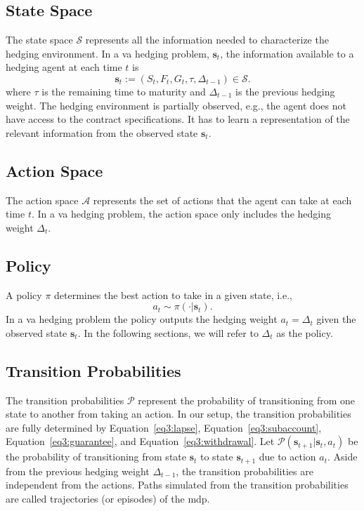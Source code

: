 \subsection{State Space}
The state space $\mathcal{S}$ represents all the information needed to characterize the hedging environment.
In a \gls{va} hedging problem, $\mathbf{s}_t$, the information available to a hedging agent at each time $t$ is 
$$\mathbf{s}_t := (S_t, F_t, G_t, \tau, \Delta_{t-1}) \in \mathcal{S}.$$
where $\tau$ is the remaining time to maturity and $\Delta_{t-1}$ is the previous hedging weight.
The hedging environment is partially observed, e.g., the agent does not have access to the contract specifications.
It has to learn a representation of the relevant information from the observed state $\mathbf{s}_t$.

\subsection{Action Space}

The action space $\mathcal{A}$ represents the set of actions that the agent can take at each time $t$.
In a \gls{va} hedging problem, the action space only includes the hedging weight $\Delta_t$.

\subsection{Policy}

A policy $\pi$ determines the best action to take in a given state, i.e.,
$$a_t \sim \pi(\cdot|\mathbf{s}_t).$$
In a \gls{va} hedging problem the policy outputs the hedging weight $a_t = \Delta_t$ given the observed state $\mathbf{s}_t$.
In the following sections, we will refer to $\Delta_t$ as the policy.

\subsection{Transition Probabilities}

The transition probabilities $\mathcal{P}$ represent the probability of transitioning from one state to another from taking an action.
In our setup, the transition probabilities are fully determined by Equation~\eqref{eq3:lapse}, Equation~\eqref{eq3:subaccount}, Equation~\eqref{eq3:guarantee}, and Equation~\eqref{eq3:withdrawal}.
Let $\mathcal{P}(\mathbf{s}_{t+1}|\mathbf{s}_t, a_t)$ be the probability of transitioning from state $\mathbf{s}_t$ to state $\mathbf{s}_{t+1}$ due to action $a_t$.
Aside from the previous hedging weight $\Delta_{t-1}$, the transition probabilities are independent from the actions.
Paths simulated from the transition probabilities are called trajectories (or episodes) of the \gls{mdp}.

